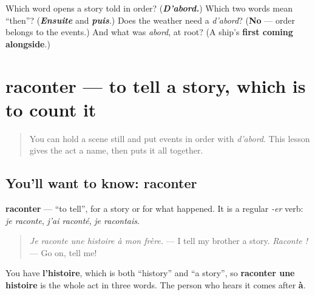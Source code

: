 \begin{tcolorbox}[breakable,colback=teal!4,colframe=teal!35!black,title={Before you move on}]
Which word opens a story told in order? (\emph{\textbf{D'abord.}}) Which two words mean \textquotedblleft{}then\textquotedblright{}? (\emph{\textbf{Ensuite}} and \emph{\textbf{puis}}.) Does the weather need a \emph{d'abord}? (\textbf{No} — order belongs to the events.) And what was \emph{abord}, at root? (A ship's \textbf{first coming alongside}.)
\end{tcolorbox}
\section[raconter]{raconter — to tell a story, which is to count it}

\label{lesson:FR-C259-raconter}



\begin{quote}
You can hold a scene still and put events in order with \emph{d'abord}. This lesson gives the act a name, then puts it all together.
\end{quote}

\subsection*{You'll want to know: raconter}
\textbf{raconter} — \textquotedblleft{}to tell\textquotedblright{}, for a story or for what happened. It is a regular \emph{-er} verb: \emph{je raconte}, \emph{j'ai raconté}, \emph{je racontais}.

\begin{quote}
\emph{Je raconte une histoire à mon frère.} — I tell my brother a story. \emph{Raconte !} — Go on, tell me!
\end{quote}

You have \textbf{l'histoire}, which is both \textquotedblleft{}history\textquotedblright{} and \textquotedblleft{}a story\textquotedblright{}, so \textbf{raconter une histoire} is the whole act in three words. The person who hears it comes after \textbf{à}.

